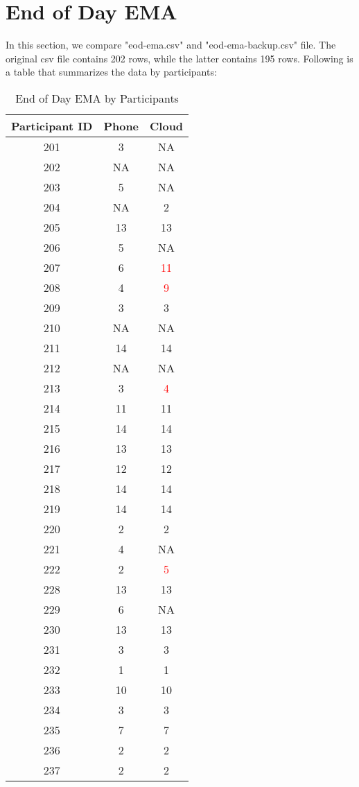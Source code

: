 \documentclass[11pt]{article}
\begin{document}
\section{End of Day EMA}
In this section, we compare "eod-ema.csv" and "eod-ema-backup.csv" file. The original csv file contains 202 rows, while the latter contains 195 rows. Following is a table that summarizes the data by participants:
\begin{table}[htb]
\centering
\begin{tabular}{|c|c|c|} 
 \hline
Participant ID & Phone & Cloud \\
 \hline
 201 & 3 & NA \\
 \hline
 202 &  NA & NA \\
 \hline
 203 & 5 & NA \\
 \hline
 204 & NA & 2 \\
\hline  
205 & 13 & 13 \\
\hline
206& 5 & NA \\
\hline
207 & 6 & \textcolor{red}{11} \\
\hline
208 & 4 & \textcolor{red}{9} \\
\hline
209 & 3 &  3 \\
\hline
210 & NA & NA \\
\hline
211 & 14 & 14 \\
\hline
212 & NA & NA \\
\hline
213 & 3 & \textcolor{red}{4} \\
\hline
214 & 11 & 11 \\
\hline
215 & 14 & 14 \\
\hline
216 & 13 & 13 \\
\hline
217 & 12 & 12 \\
\hline
218 & 14 & 14 \\
\hline
219 & 14 & 14 \\
\hline
220 & 2 & 2\\
\hline
221 & 4 & NA \\
\hline
222 & 2 & \textcolor{red}{5} \\
\hline
228 & 13 & 13 \\
\hline
229 & 6 & NA \\
\hline
230 & 13 & 13 \\
\hline
231 & 3 & 3 \\
\hline
232 & 1 & 1 \\
\hline
233 & 10 & 10 \\
\hline
234 & 3 & 3 \\
\hline
235 & 7 & 7 \\
\hline
236 & 2 & 2 \\
\hline
237 & 2 & 2 \\
\hline
\end{tabular}
\caption{End of Day EMA by Participants}
\label{table:3}
\end{table}
\end{document}
